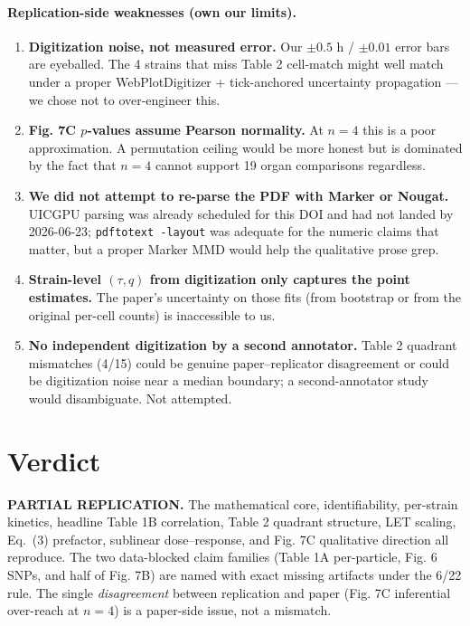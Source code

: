 \documentclass[11pt]{article}
\begin{document}
\paragraph{Replication-side weaknesses (own our limits).}
\begin{enumerate}
    \item \textbf{Digitization noise, not measured error.} Our $\pm 0.5$ h /
    $\pm 0.01$ error bars are eyeballed. The 4 strains that miss Table 2 cell-match
    might well match under a proper WebPlotDigitizer + tick-anchored uncertainty
    propagation --- we chose not to over-engineer this.
    \item \textbf{Fig. 7C $p$-values assume Pearson normality.} At $n = 4$ this is a
    poor approximation. A permutation ceiling would be more honest but is dominated
    by the fact that $n = 4$ cannot support 19 organ comparisons regardless.
    \item \textbf{We did not attempt to re-parse the PDF with Marker or Nougat.}
    UICGPU parsing was already scheduled for this DOI and had not landed by
    2026-06-23; \texttt{pdftotext -layout} was adequate for the numeric claims that
    matter, but a proper Marker MMD would help the qualitative prose grep.
    \item \textbf{Strain-level $(\tau, q)$ from digitization only captures the point
    estimates.} The paper's uncertainty on those fits (from bootstrap or from the
    original per-cell counts) is inaccessible to us.
    \item \textbf{No independent digitization by a second annotator.} Table 2 quadrant
    mismatches (4/15) could be genuine paper--replicator disagreement or could be
    digitization noise near a median boundary; a second-annotator study would
    disambiguate. Not attempted.
\end{enumerate}

\section{Verdict}

\textbf{PARTIAL REPLICATION.} The mathematical core, identifiability, per-strain
kinetics, headline Table 1B correlation, Table 2 quadrant structure, LET scaling,
Eq.~(3) prefactor, sublinear dose--response, and Fig. 7C qualitative direction all
reproduce. The two data-blocked claim families (Table 1A per-particle, Fig. 6
SNPs, and half of Fig. 7B) are named with exact missing artifacts under the 6/22
rule. The single \emph{disagreement} between replication and paper (Fig. 7C
inferential over-reach at $n=4$) is a paper-side issue, not a mismatch.
\end{document}
